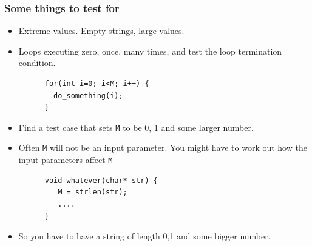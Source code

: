\documentclass{beamer}
\begin{document}
\begin{frame}[fragile]
  \frametitle{Some things to test for}
  \begin{itemize}
  \item Extreme values. Empty strings, large values.
  \item Loops executing zero, once, many times, and test the loop
    termination condition.
    \begin{lstlisting}
      for(int i=0; i<M; i++) {
        do_something(i);
      }
    \end{lstlisting}
 \item  Find a test case that sets {\tt M} to be 0, 1 and some larger
   number. 
 \item Often {\tt M} will not be an input parameter. You might have to
   work out how the input parameters affect {\tt M}
   \begin{lstlisting}
      void whatever(char* str) {
         M = strlen(str); 
         .... 
      }
   \end{lstlisting}
\item  So you have to have a string  of length 0,1 and some bigger number.
\end{itemize}
\end{frame}
\end{document}
